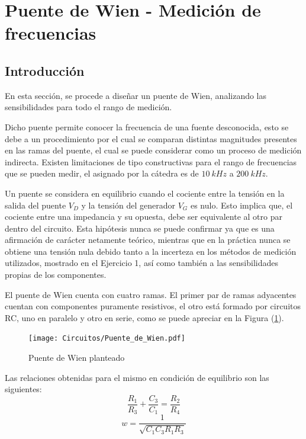 


\section{Puente de Wien - Medición de frecuencias}

\subsection{Introducción}

En esta sección, se procede a diseñar un puente de Wien, analizando las sensibilidades para todo el rango de medición.

Dicho puente permite conocer la frecuencia de una fuente desconocida, esto se debe a un procedimiento por el cual se comparan distintas magnitudes presentes en las ramas del puente, el cual se puede considerar como un proceso de medición indirecta. Existen limitaciones de tipo constructivas para el rango de frecuencias que se pueden medir, el asignado por la cátedra es de $10 \ kHz$ a $200 \ kHz$.

Un puente se considera en equilibrio cuando el cociente entre la tensión en la salida del puente $V_D$ y la tensión del generador $V_G$ es nulo. Esto implica que, el cociente entre una impedancia y su opuesta, debe ser equivalente al otro par dentro del circuito. Esta hipótesis nunca se puede confirmar ya que es una afirmación de carácter netamente teórico, mientras que en la práctica nunca se obtiene una tensión nula debido tanto a la incerteza en los métodos de medición utilizados, mostrado en el Ejercicio 1, así como también a las sensibilidades propias de los componentes.

El puente de Wien cuenta con cuatro ramas. El primer par de ramas adyacentes cuentan con componentes puramente resistivos, el otro está formado por circuitos RC, uno en paralelo y otro en serie, como se puede apreciar en la Figura (\ref{fig:Puente_de_wien}).
\begin{figure}[H]
\centering
\texttt{[image: Circuitos/Puente\_de\_Wien.pdf]}
\caption{Puente de Wien planteado}
\label{fig:Puente_de_wien}
\end{figure}

Las relaciones obtenidas para el mismo en condición de equilibrio son las siguientes:
\begin{equation}
\frac{R_1}{R_3}+\frac{C_3}{C_1}=\frac{R_2}{R_4}
\end{equation}
\begin{equation}
w=\frac{1}{\sqrt{C_1C_3R_1R_3}}
\end{equation}

